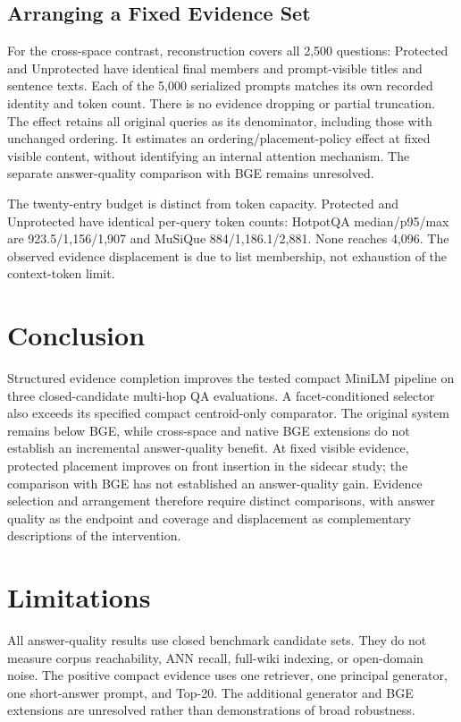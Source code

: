 \documentclass[11pt]{article}
\begin{document}
\subsection{Arranging a Fixed Evidence Set}
For the cross-space contrast, reconstruction covers all 2,500 questions: Protected and
Unprotected have identical final members and prompt-visible titles and
sentence texts. Each of the 5,000 serialized prompts matches its own recorded
identity and token count. There is no evidence dropping or partial truncation.
The effect retains all original queries as its denominator, including those
with unchanged ordering. It estimates an ordering/placement-policy effect at
fixed visible content, without identifying an internal attention mechanism.
The separate answer-quality comparison with BGE remains unresolved.

The twenty-entry budget is distinct from token capacity. Protected and
Unprotected have identical per-query token counts: HotpotQA median/p95/max
are 923.5/1,156/1,907 and MuSiQue 884/1,186.1/2,881. None reaches 4,096.
The observed evidence displacement is due to list membership, not exhaustion
of the context-token limit.

\section{Conclusion}
Structured evidence completion improves the tested compact MiniLM pipeline on
three closed-candidate multi-hop QA evaluations. A facet-conditioned selector
also exceeds its specified compact centroid-only comparator. The original
system remains below BGE, while cross-space and native BGE extensions do not
establish an incremental answer-quality benefit. At fixed visible evidence,
protected placement improves on front insertion in the sidecar study;
the comparison with BGE has not established an answer-quality gain.
Evidence selection and arrangement therefore require distinct comparisons,
with answer quality as the endpoint and coverage and displacement as
complementary descriptions of the intervention.

\section{Limitations}
All answer-quality results use closed benchmark candidate sets. They do not
measure corpus reachability, ANN recall, full-wiki indexing, or open-domain
noise. The positive compact evidence uses one retriever, one principal
generator, one short-answer prompt, and Top-20. The additional generator and
BGE extensions are unresolved rather than demonstrations of broad robustness.
\end{document}
